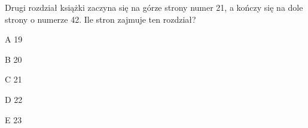 \begin{tresc}
Drugi rozdział książki zaczyna się na górze strony numer 21, a kończy się na dole strony o numerze 42. Ile stron zajmuje ten rozdział?
\end{tresc}
\begin{wariant}{A} 19 \end{wariant}
\begin{wariant}{B} 20 \end{wariant}
\begin{wariant}{C} 21 \end{wariant}
\begin{wariant}{D} 22 \end{wariant}
\begin{wariant}{E} 23 \end{wariant}
